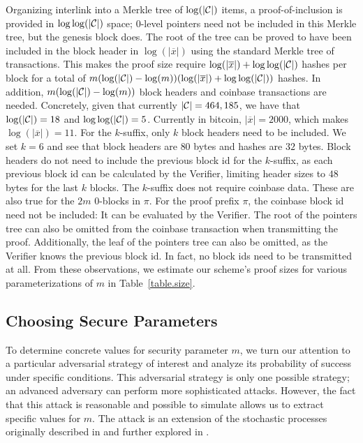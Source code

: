 Organizing interlink into a Merkle tree of $\log(|\mathcal{C}|)$ items, a
proof-of-inclusion is provided in $\log \log(|\mathcal{C}|)$ space; $0$-level
pointers need not be included in this Merkle tree, but the genesis block does.
The root of the tree can be proved to have been included in the block header in
$\log(|\overline x|)$ using the standard Merkle tree of transactions. This makes
the proof size require $\log(|\overline x|) + \log\log(|\mathcal{C}|)$ hashes per
block for a total of $m (\log(|\mathcal{C}|) - \log(m))(\log(|\overline x|) +
\log\log(|\mathcal{C}|))$ hashes. In addition, $m (\log(|\mathcal{C}|) - \log(m))$ block
headers and coinbase transactions are needed. Concretely, given that currently
$|\mathcal{C}| = 464,185$, we have that $\log(|\mathcal{C}|) = 18$ and $\log\log(|\mathcal{C}|) =
5$. Currently in bitcoin, $|\overline x| = 2000$, which makes $\log(|\overline
x|) = 11$. For the $k$-suffix, only $k$ block headers need to be included. We
set $k = 6$ and see that block headers are $80$ bytes and hashes are $32$ bytes.
Block headers do not need to include the previous block id for the $k$-suffix,
as each previous block id can be calculated by the Verifier, limiting header
sizes to $48$ bytes for the last $k$ blocks. The $k$-suffix does not require
coinbase data. These are also true for the $2m$ $0$-blocks in $\pi$. For the
proof prefix $\pi$, the coinbase block id need not be included: It can be
evaluated by the Verifier. The root of the pointers tree can also be omitted
from the coinbase transaction when transmitting the proof. Additionally, the
leaf of the pointers tree can also be omitted, as the Verifier knows the
previous block id. In fact, no block ids need to be transmitted at all. From
these observations, we estimate our scheme's proof sizes for various
parameterizations of $m$ in Table~\ref{table.size}.

\subsection{Choosing Secure Parameters}
To determine concrete values for security parameter $m$, we
turn our attention to a particular adversarial strategy of interest and analyze
its probability of success under specific conditions. This adversarial strategy
is only one possible strategy; an advanced adversary can perform more
sophisticated attacks. However, the fact that this attack is reasonable and
possible to simulate allows us to extract specific values for $m$. The attack is
an extension of the stochastic processes originally described in \cite{bitcoin}
and further explored in \cite{rosenfeld}.


